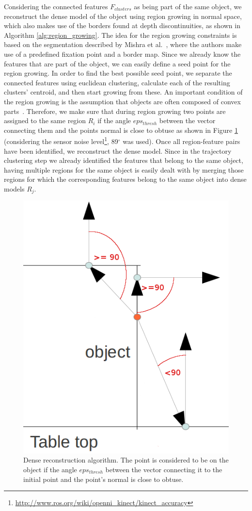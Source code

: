 Considering the connected features $F_{clusters}$ as being part of the same object, we reconstruct 
the dense model of the object using region growing in normal space, which also makes use of the 
borders found at depth discontinuities, as shown in Algorithm \ref{alg:region_growing}. 
The idea for the region growing 
constraints is based on the segmentation described by Mishra et al.~\cite{asICCV2009}, 
where the authors make use of a predefined fixation point and a border map. Since we already 
know the features that are part of the object, we can easily define a seed point for the
region growing. In order to find the best possible seed point, we separate the connected 
features using euclidean clustering, calculate each of the resulting clusters' centroid, and 
then start growing from these. An important condition of the region growing is the 
assumption that objects are often composed of convex parts~\cite{Pogor}.
Therefore, we make sure that during region growing two points are assigned to the same region $R_{i}$
if the angle $eps_{thresh}$ between the vector connecting them and the points normal is close to obtuse as shown in Figure \ref{fig:dense}
(considering the sensor noise level\footnote{\url{http://www.ros.org/wiki/openni_kinect/kinect_accuracy}}, 89$^\circ$ was used).
Once all region-feature pairs have been identified, we reconstruct the dense model.
Since in the trajectory clustering step we already identified the features that belong to the same object,
having multiple regions for the same object is easily dealt with
by merging those regions for which the corresponding features belong to the same object into dense models $R_{j}$.

\begin{figure}[ht!]
  \centering \includegraphics[width=0.5\columnwidth]{figures/dense.png}
  \vspace{2ex}
  \caption[Dense reconstruction algorithm.]{Dense reconstruction algorithm. The point is considered to be on the object if the angle $eps_{thresh}$ between the vector connecting it to the initial point and the point's normal is close to obtuse. 
  }
  \label{fig:dense}
\end{figure}

